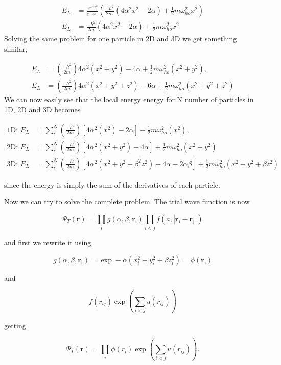 \begin{align}
E_L &= \frac{e^{-\alpha x^2}}{e^{-\alpha x^2}}\left( \frac{-\hbar^2}{2m}  (4\alpha^2 x^2 - 2\alpha) + \frac{1}{2} m\omega_{ho}^2 x^2\right) \\
E_L &= \frac{-\hbar^2}{2m}(4\alpha^2 x^2 - 2\alpha) + \frac{1}{2} m\omega_{ho}^2 x^2
\end{align}
Solving the same problem for one particle in 2D and 3D we get something similar, 

\begin{align}
E_L &= (\frac{-\hbar^2}{2m})4\alpha^2 (x^2 + y^2) - 4\alpha + \frac{1}{2} m\omega_{ho}^2 (x^2 + y^2),\\
E_L &= (\frac{-\hbar^2}{2m})4\alpha^2 (x^2 + y^2 + z^2) - 6\alpha + \frac{1}{2} m\omega_{ho}^2 (x^2 + y^2 + z^2)
\end{align}
We can now easily see that the local energy energy for N number of particles in 1D, 2D and 3D becomes

\begin{equation}\label{eq:el_ni}
\begin{split}
\text{1D: }E_L &= \sum_i^N (\frac{-\hbar^2}{2m})[4\alpha^2 (x^2) - 2\alpha] + \frac{1}{2} m\omega_{ho}^2 (x^2),\\
\text{2D: }E_L &= \sum_i^N (\frac{-\hbar^2}{2m})[4\alpha^2 (x^2 + y^2) - 4\alpha] + \frac{1}{2} m\omega_{ho}^2 (x^2 + y^2)\\
\text{3D: }E_L &= \sum_i^N (\frac{-\hbar^2}{2m})[4\alpha^2 (x^2 + y^2 + \beta^2 z^2) - 4\alpha -2\alpha \beta] + \frac{1}{2} m\omega_{ho}^2 (x^2 + y^2 + \beta z^2)
\end{split}
\end{equation}

since the energy is simply the sum of the derivatives of each particle.

Now we can try to solve the complete problem. The trial wave function is now

$$\Psi_T(\mathbf{r}) = \prod_{i} g(\alpha, \beta, \mathbf{r_i}) \prod_{i<j} f(a, |\mathbf{r_i} - \mathbf{r_j}|)$$

and first we rewrite it using 

$$g(\alpha, \beta, \mathbf{r_i}) = \exp -\alpha (x_i^2 + y_i^2 + \beta z_i^2) = \phi (\mathbf{r_i})$$

and 

$$f(r_{ij})\exp \left(\sum_{i<j}u(r_{ij})\right)$$

getting 

$$\Psi_T(\mathbf{r}) = \prod_{i} \phi (r_i) \exp \left(\sum_{i<j}u(r_{ij})\right).$$

